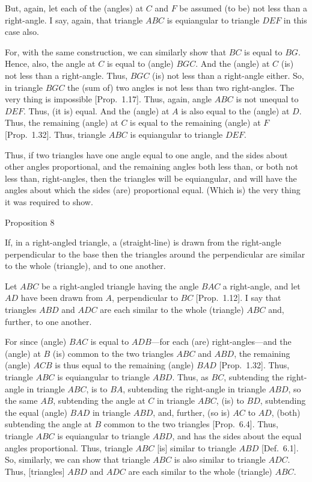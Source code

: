 But, again, let each of the (angles) at $C$ and $F$ be assumed  (to be) not
less than a right-angle. I say, again, that triangle $ABC$
is equiangular to triangle $DEF$ in this case also.

For, with the same construction, we can similarly show that $BC$ is equal to $BG$.
Hence, also, the angle at $C$ is equal to (angle) $BGC$. And  the (angle) at $C$ (is)
not less than a right-angle. Thus, $BGC$ (is) not less than a right-angle
either. So, in triangle $BGC$ the (sum of) two angles is not less than two
right-angles. The very thing is impossible [Prop.~1.17]. Thus, again,
angle $ABC$ is not unequal to $DEF$. Thus, (it is) equal.  And the (angle) at $A$
is also equal to the (angle) at $D$. Thus, the remaining (angle) at $C$ is equal
to the remaining (angle) at $F$ [Prop.~1.32]. Thus, triangle $ABC$ is equiangular to triangle $DEF$.

Thus, if two triangles have one angle equal to one angle,
and the sides about  other angles proportional, and the remaining angles
both less than, or both not less than, right-angles, then the triangles will
be equiangular, and will have the angles about which the sides (are) proportional equal. (Which is) the very thing it was required to show.


\begin{center}
{\large Proposition 8}
\end{center}

If, in a right-angled triangle, a (straight-line) is drawn from the right-angle perpendicular
to the base then the triangles around the perpendicular are similar to
the whole (triangle), and to one another.

Let $ABC$ be a right-angled triangle having the angle $BAC$ a right-angle, 
and let $AD$ have been drawn from $A$, perpendicular to $BC$  
[Prop.~1.12].  I say that
triangles $ABD$ and $ADC$ are each similar to the whole (triangle) $ABC$ and, further, to one another.

\epsfysize=2in
\centerline{}

For since (angle) $BAC$ is equal to $ADB$---for each (are) right-angles---and the (angle) at $B$ (is) common to the two triangles $ABC$ and
$ABD$, the remaining (angle) $ACB$ is thus equal to the remaining (angle)
$BAD$  [Prop.~1.32]. Thus, triangle $ABC$ is equiangular to triangle $ABD$. 
Thus, as $BC$, subtending  the right-angle in triangle $ABC$, is to
$BA$, subtending the right-angle in triangle $ABD$, so the
same $AB$, subtending the angle at $C$ in triangle $ABC$, (is) to
$BD$, subtending the equal (angle) $BAD$ in triangle $ABD$,
and, further, (so is) $AC$ to $AD$, (both) subtending the angle at $B$ common to
the two triangles [Prop.~6.4].
Thus, triangle $ABC$ is equiangular to triangle $ABD$, and has the
sides about the equal angles proportional. Thus, triangle $ABC$
[is] similar to triangle $ABD$ [Def.~6.1].
So, similarly, we can show that triangle $ABC$ is also  similar to triangle
$ADC$. Thus, [triangles] $ABD$ and $ADC$ are each similar to the whole
 (triangle) $ABC$.
 

